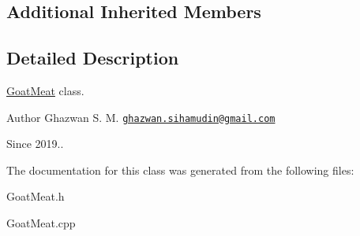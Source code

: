 \subsection*{Additional Inherited Members}


\subsection{Detailed Description}
\hyperlink{classGoatMeat}{Goat\+Meat} class.

\begin{DoxyAuthor}{Author}
Ghazwan S. M. \href{mailto:ghazwan.sihamudin@gmail.com}{\tt ghazwan.\+sihamudin@gmail.\+com} 
\end{DoxyAuthor}
\begin{DoxySince}{Since}
2019.. 
\end{DoxySince}


The documentation for this class was generated from the following files\+:\begin{DoxyCompactItemize}
\item 
Goat\+Meat.\+h\item 
Goat\+Meat.\+cpp\end{DoxyCompactItemize}
